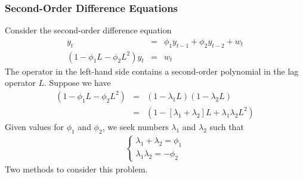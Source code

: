 \subsubsection{Second-Order Difference Equations}
Consider the second-order difference equation
\begin{eqnarray*}
y_{t}&=&\phi_{1}y_{t-1}+\phi_{2}y_{t-2}+w_{t}\\
(1-\phi_{1}L-\phi_{2}L^{2})y_{t}&=&w_{t}
\end{eqnarray*}
The operator in the left-hand side contains a second-order polynomial in the lag operator $L$. Suppose we have
\begin{eqnarray*}
(1-\phi_{1}L-\phi_{2}L^{2})&=&(1-\lambda_{1}L)(1-\lambda_{2}L)\\
&=&(1-[\lambda_{1}+\lambda_{2}]L+\lambda_{1}\lambda_{2}L^{2})
\end{eqnarray*}
Given values for $\phi_{1}$ and $\phi_{2}$, we seek numbers $\lambda_{1}$ and $\lambda_{2}$ such that
\begin{eqnarray*}
\begin{cases}
\lambda_{1}+\lambda_{2}=\phi_{1}\\
\lambda_{1}\lambda_{2}=-\phi_{2}
\end{cases}
\end{eqnarray*}
Two methods to consider this problem.
